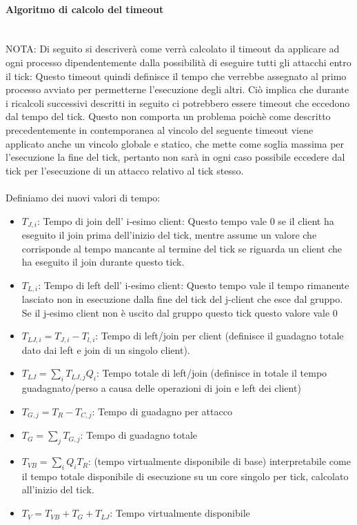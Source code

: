 \documentclass[11pt]{article}
\begin{document}
\paragraph{Algoritmo di calcolo del timeout}\mbox{}\\
NOTA: Di seguito si descriverà come verrà calcolato il timeout da applicare ad ogni processo dipendentemente dalla possibilità di eseguire tutti gli attacchi entro il tick: Questo timeout quindi definisce il tempo che verrebbe assegnato al primo processo avviato per permetterne l'esecuzione degli altri. Ciò implica che durante i ricalcoli successivi descritti in seguito ci potrebbero essere timeout che eccedono dal tempo del tick. Questo non comporta un problema poichè come descritto precedentemente in contemporanea al vincolo del seguente timeout viene applicato anche un vincolo globale e statico, che mette come soglia massima per l'esecuzione la fine del tick, pertanto non sarà in ogni caso possibile eccedere dal tick per l'esecuzione di un attacco relativo al tick stesso.\\\\
Definiamo dei nuovi valori di tempo:
\begin{itemize}
	\item $T_{J, i}$: Tempo di join dell' i-esimo client: Questo tempo vale 0 se il client ha eseguito il join prima dell'inizio del tick, mentre assume un valore che corrisponde al tempo mancante al termine del tick se riguarda un client che ha eseguito il join durante questo tick.
	\item $T_{L, i}$: Tempo di left dell' i-esimo client: Questo tempo vale il tempo rimanente lasciato non in esecuzione  dalla fine del tick del j-client che esce dal gruppo. Se il j-esimo client non è uscito dal gruppo questo tick questo valore vale 0
	\item $T_{LJ, i} = T_{J,i}-T_{l,i}$: Tempo di left/join per client (definisce il guadagno totale dato dai left e join di un singolo client).
	\item $T_{LJ} = \sum_{i} T_{LJ,j} Q_i$: Tempo totale di left/join (definisce in totale il tempo guadagnato/perso a causa delle operazioni di join e left dei client)
	\item $T_{G, j} = T_R - T_{C, j}$: Tempo di guadagno per attacco
	\item $T_G = \sum_{j} T_{G,j}$: Tempo di guadagno totale
	\item $T_{VB} = \sum_{i} Q_i T_R$: (tempo virtualmente disponibile di base) interpretabile come il tempo totale disponibile di esecuzione su un core singolo per tick, calcolato all'inizio del tick.
	\item $T_{V} = T_{VB} + T_G + T_{LJ}$: Tempo virtualmente disponibile
\end{itemize}
\end{document}
